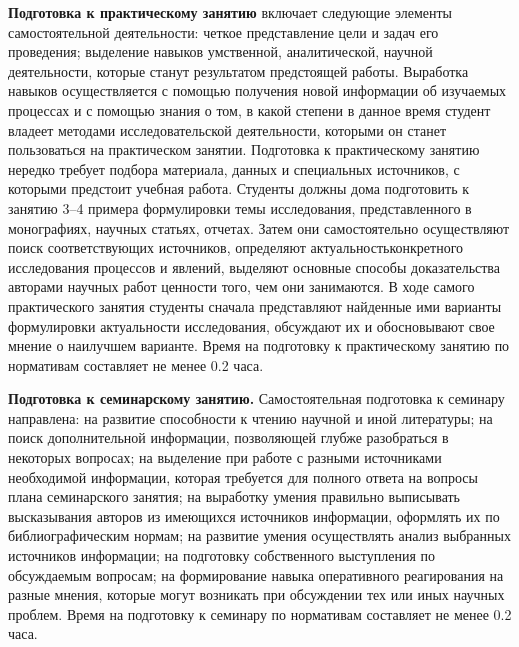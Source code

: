 \documentclass[12pt]{scrartcl}
\renewcommand{\paragraph}[1]{\par\textbf{#1}}
\begin{document}
\paragraph{Подготовка к практическому занятию}
включает следующие элементы самостоятельной деятельности: четкое представление
цели и задач его проведения; выделение навыков умственной, аналитической, научной
деятельности, которые станут результатом предстоящей работы. Выработка навыков
осуществляется с помощью получения новой информации об изучаемых процессах и с
помощью знания о том, в какой степени в данное время студент владеет методами
исследовательской деятельности, которыми он станет пользоваться на практическом
занятии. Подготовка к практическому занятию нередко требует подбора материала,
данных и специальных источников, с которыми предстоит учебная работа. Студенты
должны дома подготовить к занятию 3--4 примера формулировки темы исследования,
представленного в монографиях, научных статьях, отчетах. Затем они самостоятельно
осуществляют поиск соответствующих источников, определяют актуальностьконкретного исследования процессов и явлений, выделяют основные способы
доказательства авторами научных работ ценности того, чем они занимаются. В ходе
самого практического занятия студенты сначала представляют найденные ими варианты
формулировки актуальности исследования, обсуждают их и обосновывают свое мнение о
наилучшем варианте. Время на подготовку к практическому занятию по нормативам
составляет не менее 0.2 часа.

\paragraph{Подготовка к семинарскому занятию.} Самостоятельная подготовка к семинару
направлена: на развитие способности к чтению научной и иной литературы; на поиск
дополнительной информации, позволяющей глубже разобраться в некоторых вопросах; на
выделение при работе с разными источниками необходимой информации, которая
требуется для полного ответа на вопросы плана семинарского занятия; на выработку
умения правильно выписывать высказывания авторов из имеющихся источников
информации, оформлять их по библиографическим нормам; на развитие умения
осуществлять анализ выбранных источников информации; на подготовку собственного
выступления по обсуждаемым вопросам; на формирование навыка оперативного
реагирования на разные мнения, которые могут возникать при обсуждении тех или иных
научных проблем. Время на подготовку к семинару по нормативам составляет не менее
0.2 часа.
\end{document}

